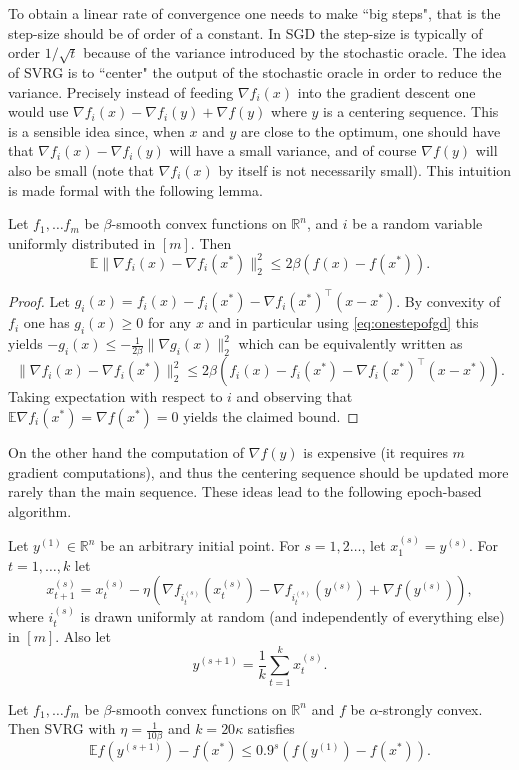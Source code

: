 \documentclass[openany]{now}
\newcommand{\E}{\mathbb{E}}
\newcommand{\R}{\mathbb{R}}
\begin{document}
To obtain a linear rate of convergence one needs to make ``big steps", that is the step-size should be of order of a constant. In SGD the step-size is typically of order $1/\sqrt{t}$ because of the variance introduced by the stochastic oracle. The idea of SVRG is to ``center" the output of the stochastic oracle in order to reduce the variance. Precisely instead of feeding $\nabla f_{i}(x)$ into the gradient descent one would use $\nabla f_i(x) - \nabla f_i(y) + \nabla f(y)$ where $y$ is a centering sequence. This is a sensible idea since, when $x$ and $y$ are close to the optimum, one should have that $\nabla f_i(x) - \nabla f_i(y)$ will have a small variance, and of course $\nabla f(y)$ will also be small (note that $\nabla f_i(x)$ by itself is not necessarily small). This intuition is made formal with the following lemma.
\begin{lemma} \label{lem:SVRG}
Let $f_1, \hdots f_m$ be $\beta$-smooth convex functions on $\R^n$, and $i$ be a random variable uniformly distributed in $[m]$. Then
$$\E \| \nabla f_i(x) - \nabla f_i(x^*) \|_2^2 \leq 2 \beta (f(x) - f(x^*)) .$$
\end{lemma}

\begin{proof}
Let $g_i(x) = f_i(x) - f_i(x^*) - \nabla f_i(x^*)^{\top} (x - x^*)$. By convexity of $f_i$ one has $g_i(x) \geq 0$ for any $x$ and in particular using \eqref{eq:onestepofgd} this yields $- g_i(x) \leq - \frac{1}{2\beta} \|\nabla g_i(x)\|_2^2$ which can be equivalently written as
$$\| \nabla f_i(x) - \nabla f_i(x^*) \|_2^2 \leq 2 \beta (f_i(x) - f_i(x^*) - \nabla f_i(x^*)^{\top} (x - x^*)) .$$
Taking expectation with respect to $i$ and observing that $\E \nabla f_i(x^*) = \nabla f(x^*) = 0$ yields the claimed bound.
\end{proof}
On the other hand the computation of $\nabla f(y)$ is expensive (it requires $m$ gradient computations), and thus the centering sequence should be updated more rarely than the main sequence. These ideas lead to the following epoch-based algorithm.

Let $y^{(1)} \in \R^n$ be an arbitrary initial point. For $s=1, 2 \ldots$, let $x_1^{(s)}=y^{(s)}$. For $t=1, \hdots, k$ let 
$$x_{t+1}^{(s)} = x_t^{(s)} - \eta \left( \nabla f_{i_t^{(s)}}(x_t^{(s)}) - \nabla f_{i_t^{(s)}} (y^{(s)}) + \nabla f(y^{(s)}) \right) ,$$
where $i_t^{(s)}$ is drawn uniformly at random (and independently of everything else) in $[m]$. Also let
$$y^{(s+1)} = \frac1{k} \sum_{t=1}^k x_t^{(s)} .$$

\begin{theorem} \label{th:SVRG}
Let $f_1, \hdots f_m$ be $\beta$-smooth convex functions on $\R^n$ and $f$ be $\alpha$-strongly convex. Then SVRG with $\eta = \frac{1}{10\beta}$ and $k = 20 \kappa$ satisfies
$$\E f(y^{(s+1)}) - f(x^*) \leq 0.9^s (f(y^{(1)}) - f(x^*)) .$$
\end{theorem}
\end{document}
